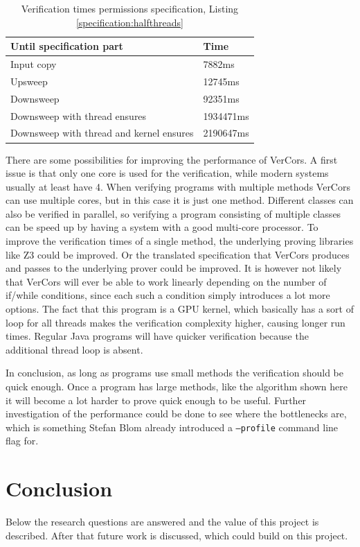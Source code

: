 \documentclass[a4paper]{article}
\newcommand{\code}[1]{\texttt{\small \color{inline}#1}} %
\begin{document}
\begin{table}[ht]
	\centering \caption{Verification times permissions specification, Listing \ref{specification:halfthreads}}
	\begin{tabular}{p{80mm}p{20mm}} \hline
		\textbf{Until specification part} & \textbf{Time}\\\hline
		Input copy & 7882ms\\\hline
		Upsweep & 12745ms\\\hline
		Downsweep & 92351ms\\\hline
		Downsweep with thread ensures & 1934471ms\\\hline
		Downsweep with thread and kernel ensures & 2190647ms\\\hline
	\end{tabular}
	\label{table:runTimes}
\end{table}

There are some possibilities for improving the performance of VerCors. A first issue is that only one core is used for the verification, while modern systems usually at least have 4. When verifying programs with multiple methods VerCors can use multiple cores, but in this case it is just one method. Different classes can also be verified in parallel, so verifying a program consisting of multiple classes can be speed up by having a system with a good multi-core processor. To improve the verification times of a single method, the underlying proving libraries like Z3 could be improved. Or the translated specification that VerCors produces and passes to the underlying prover could be improved. It is however not likely that VerCors will ever be able to work linearly depending on the number of if/while conditions, since each such a condition simply introduces a lot more options. The fact that this program is a GPU kernel, which basically has a sort of loop for all threads makes the verification complexity higher, causing longer run times. Regular Java programs will have quicker verification because the additional thread loop is absent.

In conclusion, as long as programs use small methods the verification should be quick enough. Once a program has large methods, like the algorithm shown here it will become a lot harder to prove quick enough to be useful. Further investigation of the performance could be done to see where the bottlenecks are, which is something Stefan Blom already introduced a \code{--profile} command line flag for.

\section{Conclusion}\label{chapter:conclusion}
Below the research questions are answered and the value of this project is described. After that future work is discussed, which could build on this project.
\end{document}

